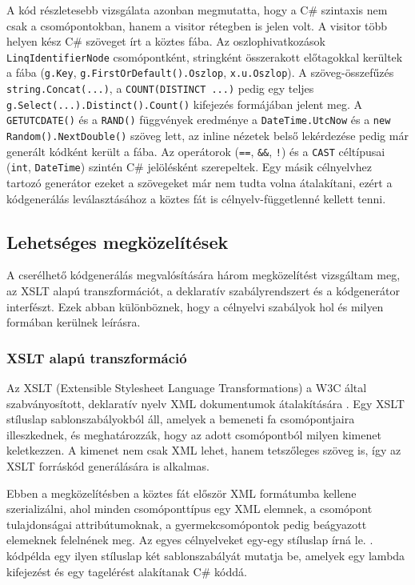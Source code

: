 \documentclass[a4paper,12pt]{article}
\begin{document}
A kód részletesebb vizsgálata azonban megmutatta, hogy a C\# szintaxis nem csak a csomópontokban, hanem a visitor rétegben is jelen volt. A visitor több helyen kész C\# szöveget írt a köztes fába. Az oszlophivatkozások \texttt{LinqIdentifierNode} csomópontként, stringként összerakott előtagokkal kerültek a fába (\texttt{g.Key}, \texttt{g.FirstOrDefault().Oszlop}, \texttt{x.u.Oszlop}). A szöveg-összefűzés \texttt{string.Concat(...)}, a \texttt{COUNT(DISTINCT ...)} pedig egy teljes \texttt{g.Select(...).Distinct().Count()} kifejezés formájában jelent meg. A \texttt{GETUTCDATE()} és a \texttt{RAND()} függvények eredménye a \texttt{DateTime.UtcNow} és a \texttt{new Random().NextDouble()} szöveg lett, az inline nézetek belső lekérdezése pedig már generált kódként került a fába. Az operátorok (\texttt{==}, \texttt{\&\&}, \texttt{!}) és a \texttt{CAST} céltípusai (\texttt{int}, \texttt{DateTime}) szintén C\# jelölésként szerepeltek. Egy másik célnyelvhez tartozó generátor ezeket a szövegeket már nem tudta volna átalakítani, ezért a kódgenerálás leválasztásához a köztes fát is célnyelv-függetlenné kellett tenni.

\subsection{Lehetséges megközelítések}

A cserélhető kódgenerálás megvalósítására három megközelítést vizsgáltam meg, az XSLT alapú transzformációt, a deklaratív szabályrendszert és a kódgenerátor interfészt. Ezek abban különböznek, hogy a célnyelvi szabályok hol és milyen formában kerülnek leírásra.

\subsubsection{XSLT alapú transzformáció}

Az XSLT (Extensible Stylesheet Language Transformations) a W3C által szabványosított, deklaratív nyelv XML dokumentumok átalakítására \cite{w3c1999xslt}. Egy XSLT stíluslap sablonszabályokból áll, amelyek a bemeneti fa csomópontjaira illeszkednek, és meghatározzák, hogy az adott csomópontból milyen kimenet keletkezzen. A kimenet nem csak XML lehet, hanem tetszőleges szöveg is, így az XSLT forráskód generálására is alkalmas.

Ebben a megközelítésben a köztes fát először XML formátumba kellene szerializálni, ahol minden csomóponttípus egy XML elemnek, a csomópont tulajdonságai attribútumoknak, a gyermekcsomópontok pedig beágyazott elemeknek felelnének meg. Az egyes célnyelveket egy-egy stíluslap írná le. . kódpélda egy ilyen stíluslap két sablonszabályát mutatja be, amelyek egy lambda kifejezést és egy tagelérést alakítanak C\# kóddá.
\end{document}
